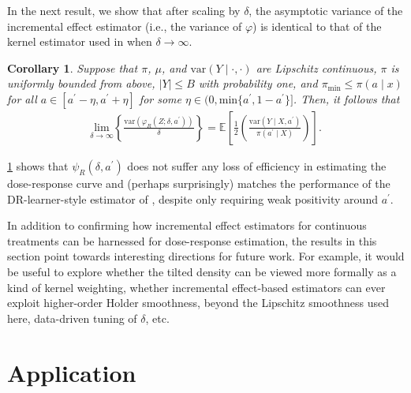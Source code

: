 \documentclass[11pt,twoside]{article}
\newcommand{\var}{\text{var}}
\newtheorem{corollary}{Corollary}
\theoremstyle{definition}
\theoremstyle{remark}
\begin{document}
In the next result, we show that after scaling by $\delta$, the asymptotic variance of the incremental effect estimator (i.e., the variance of $\varphi$) is identical to that of the kernel estimator used in \cite{kennedy2017cte} when $\delta \rightarrow \infty$.

\begin{corollary}\label{sigma_delta_ratio}
    Suppose that $\pi$, $\mu$, and $\var(Y \mid \cdot, \cdot)$ are Lipschitz continuous, $\pi$ is uniformly bounded from above, $|Y|\leq B$ with probability one,  and $\pi_{\min} \leq \pi(a \mid x)$ for all $a \in  [a^{\prime} - \eta, a^\prime + \eta]$ for some $\eta \in (0, \text{min}\{a^\prime, 1 - a^\prime\}]$. Then, it follows that
    \begin{align*}
        \underset{\delta \to \infty}{\text{lim}}\left\{ \frac{ \var(\varphi_R(Z;\delta, a^\prime)) }{\delta}\right\} =  \mathbb{E} \left[ \frac{1}{2} \left(\frac{\var(Y\mid X,a^\prime)}{\pi(a^\prime\mid X)} \right) \right] .
    \end{align*}
\end{corollary}

\cref{sigma_delta_ratio} shows that $\psi_R(\delta, a^\prime)$ does not suffer any loss of efficiency in estimating the dose-response curve and (perhaps surprisingly) matches the performance of the DR-learner-style estimator of \cite{kennedy2017cte}, despite only requiring weak positivity around $a^\prime$.

In addition to confirming how incremental effect estimators for continuous treatments can be harnessed for dose-response estimation, the results in this section point towards interesting directions for future work. For example, it would be useful to explore whether the tilted density can be viewed more formally as a kind of kernel weighting, whether incremental effect-based estimators can ever exploit higher-order Holder smoothness, beyond the Lipschitz smoothness used here, data-driven tuning of $\delta$, etc. 


\section{Application} \label{experiments_and_simulations}
\end{document}
